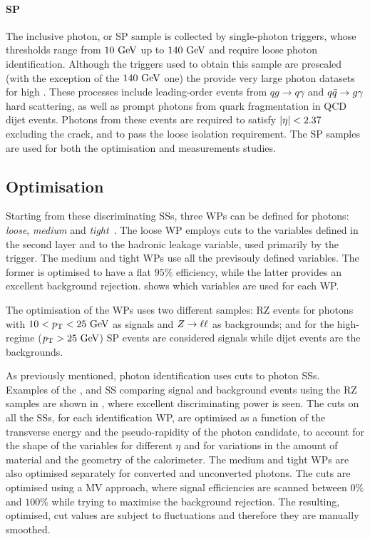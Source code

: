 \paragraph{\acf{SP}}

The inclusive photon, or \acf{SP} sample is collected by single-photon triggers, whose thresholds range from \(10~\text{GeV}\) up to \(140~\text{GeV}\) and require loose photon identification. Although the triggers used to obtain this sample are prescaled (with the exception of the \(140~\text{GeV}\) one) the provide very large photon datasets for high \pt.
These processes include leading-order \gammajet events from \(qg\to q\gamma\) and \(q\bar{q} \rightarrow g\gamma\) hard scattering, as well as prompt photons from quark fragmentation in \ac{QCD} dijet events.
Photons from these events are required to satisfy \(|\eta|<2.37\) excluding the crack, and to pass the loose isolation requirement. The \ac{SP} samples are used for both the optimisation and measurements studies.


\subsection{Optimisation}
\label{subsec:pid_ss:pid:optimisation}

Starting from these discriminating \acp{SS}, three \acp{WP} can be defined for photons: \textit{loose}, \textit{medium} and \textit{tight}~\cite{ATLAS-EGamma-Performance-2024}. The loose \ac{WP} employs cuts to the variables defined in the second layer and to the hadronic leakage variable, used primarily by the trigger.
The medium and tight \acp{WP} use all the previsouly defined variables. The former is optimised to have a flat \(95\%\) efficiency, while the latter provides an excellent background rejection. \Tab{\ref{tab:pid_ss:ss:ss_variables}} shows which variables are used for each \ac{WP}.

The optimisation of the \acp{WP} uses two different samples: \ac{RZ} events for photons with \(10<p_{\text{T}}<25~\text{GeV}\) as signals and \(Z\rightarrow \ell\ell\) as backgrounds; and for the high-\pt regime (\(p_{\text{T}}>25~\text{GeV}\)) \ac{SP} events are considered signals while dijet events are the backgrounds.

As previously mentioned, photon identification uses cuts to photon \acfp{SS}. Examples of the \reta, \eratio and \weta \ac{SS} comparing signal and background events using the \ac{RZ} samples are shown in \Fig{\ref{fig:pid_ss:optimisation:shower_shapes}}, where excellent discriminating power is seen.
The cuts on all the \acp{SS}, for each identification \ac{WP}, are optimised as a function of the transverse energy and the pseudo-rapidity of the photon candidate, to account for the shape of the variables for different \(\eta\) and for variations in the amount of material and the geometry of the calorimeter. The medium and tight \acp{WP} are also optimised separately for converted and unconverted photons.
The cuts are optimised using a \ac{MV} approach, where signal efficiencies are scanned between \(0\%\) and \(100\%\) while trying to maximise the background rejection. The resulting, optimised, cut values are subject to fluctuations and therefore they are manually smoothed.

